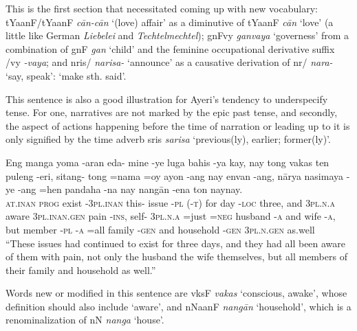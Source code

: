 \documentclass[12pt,paper=letter]{scrartcl}
\newcommand{\fw}[1]{\textit{#1}} %
\newcommand{\q}[1]{\enquote{#1}} %
\newcommand{\qq}[1]{\enquote*{#1}} %
\newcommand{\divider}{
    \vspace{\baselineskip}
}
\newcommand{\mor}[1]{\textsc{\lowercase{#1}}}
\newcommand{\ayr}[1]{{\Tagati #1}}
\begin{document}
This is the first section that necessitated coming up with new vocabulary:
\ayr{tYaanF/tYaanF} \fw{cān-cān} \qq{(love) affair} as a diminutive of 
\ayr{tYaanF} \fw{cān} \qq{love} (a little like German \fw{Liebelei} and 
\fw{Techtelmechtel}); \ayr{gnFvy} \fw{ganvaya} \qq{governess} from a 
combination of \ayr{gnF} \fw{gan} \qq{child} and the feminine occupational 
derivative suffix \ayr{/vy} \fw{-vaya}; and \ayr{nris/} \fw{narisa-} 
\qq{announce} as a causative derivation of \ayr{nr/} \fw{nara-} \qq{say, 
speak}: \qq{make sth. said}.

This sentence is also a good illustration for Ayeri's tendency to underspecify
tense. For one, narratives are not marked by the epic past tense, and secondly,
the aspect of actions happening before the time of narration or leading up to it
is only signified by the time adverb \ayr{sris} \fw{sarisa} \qq{previous(ly), 
earlier; former(ly)}.

\divider

\begin{exe}  %
    \ex \gll Eng manga yoma -aran eda- mine -ye {} luga bahis -ya kay, nay tong 
	vakas ten puleng -eri, sitang- tong =nama =oy ayon -ang nay envan -ang, 
	nārya nasimaya -ye -ang =hen pandaha -na nay nangān -ena ton naynay. \\
    \mor{AT.INAN} \mor{PROG} exist \mor{-3PL.INAN} this- issue \mor{-PL} 
	\mor{(-T)} for day \mor{-LOC} three, and \mor{3PL.N.A} aware 
	\mor{3PL.INAN.GEN} pain \mor{-INS}, self- \mor{3PL.N.A} =just \mor{=NEG}
	husband \mor{-A} and wife \mor{-A}, but member \mor{-PL} \mor{-A} 
	=all family \mor{-GEN} and household \mor{-GEN} \mor{3PL.N.GEN} as.well \\
    \glt \q{These issues had continued to exist for three days, and they had 
	all been aware of them with pain, not only the husband the wife 
	themselves, but all members of their family and household as well.}
\end{exe}

Words new or modified in this sentence are \ayr{vksF} \fw{vakas} \qq{conscious,
awake}, whose definition should also include \qq{aware}, and \ayr{nNaanF}
\fw{nangān} \qq{household}, which is a renominalization of \ayr{nN} \fw{nanga}
\qq{house}.

\divider
\end{document}

